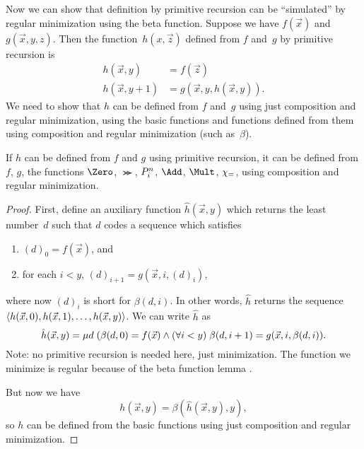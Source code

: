\documentclass[../../../include/open-logic-section]{subfiles}
\begin{document}

Now we can show that definition by primitive recursion can be
``simulated'' by regular minimization using the beta function. Suppose
we have $f(\vec x)$ and $g(\vec x, y, z)$. Then the function~$h(x,\vec
z)$ defined from $f$ and~$g$ by primitive recursion is
\begin{align*}
h(\vec x, y) & =  f(\vec z) \\
h(\vec x, y+1) & =  g(\vec x, y, h(\vec x, y)).
\end{align*}
We need to show that $h$ can be defined from $f$ and~$g$ using just
composition and regular minimization, using the basic functions and
functions defined from them using composition and regular minimization
(such as~$\beta$).

\begin{lem}
If $h$ can be defined from $f$ and $g$ using primitive recursion, it
can be defined from $f$, $g$, the functions $\Zero$, $\Succ$,
$P^{n}_{i}$, $\Add$, $\Mult$, $\chi_{=}$, using composition and
regular minimization.
\end{lem}

\begin{proof}
First, define an auxiliary function $\hat h(\vec x, y)$ which returns
the least number~$d$ such that $d$ codes a sequence which satisfies
\begin{enumerate}
\item $(d)_0 = f(\vec x)$, and
\item for each $i < y$, $(d)_{i+1} = g(\vec x, i, (d)_i)$,
\end{enumerate}
where now $(d)_i$ is short for $\beta(d,i)$. In other words, $\hat h$
returns the sequence $\langle h(\vec x, 0), h(\vec x, 1), \dots, h(\vec
x, y) \rangle$. We can write $\hat h$ as
\[
\hat h(\vec x, y) = \mu d \; (\beta(d,0) = f(\vec x) \land (\forall i <
  y)\; \beta(d,i+1) = g(\vec x, i,\beta(d,i)).
\]
Note: no primitive recursion is needed here, just minimization. The
function we minimize is regular because of the beta function lemma
.

But now we have
\[
h(\vec x, y) = \beta(\hat h(\vec x, y), y),
\]
so $h$ can be defined from the basic functions using just composition
and regular minimization.
\end{proof}
\end{document}
